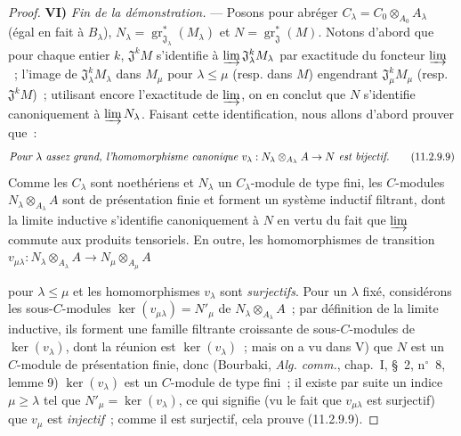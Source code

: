 \begin{proof}
\medskip
\noindent\textbf{VI)} \emph{Fin de la démonstration.} --- Posons pour abréger
$C_\lambda=C_0\otimes_{A_0}A_\lambda$ (égal en fait à $B_\lambda$),
$N_\lambda=\operatorname{gr}_{\mathfrak J_\lambda}^*(M_\lambda)$ et
$N=\operatorname{gr}_{\mathfrak J}^*(M)$. Notons d'abord que pour chaque
entier $k$, $\mathfrak J^kM$ s'identifie à
$\varinjlim\mathfrak J_\lambda^kM_\lambda$ par exactitude du foncteur
$\varinjlim$~; l'image de $\mathfrak J_\lambda^kM_\lambda$ dans $M_\mu$ pour
$\lambda\leq\mu$ (resp. dans $M$) engendrant $\mathfrak J_\mu^kM_\mu$
(resp. $\mathfrak J^kM$)~; utilisant encore l'exactitude de $\varinjlim$, on
en conclut que $N$ s'identifie canoniquement à $\varinjlim N_\lambda$. Faisant
cette identification, nous allons d'abord prouver que~:
\begin{equation}
\text{\emph{Pour $\lambda$ assez grand, l'homomorphisme canonique
$v_\lambda:N_\lambda\otimes_{A_\lambda}A\to N$ est bijectif.}}
\label{IV.11.2.9.9-fr}
\tag{11.2.9.9}
\end{equation}
Comme les $C_\lambda$ sont noethériens et $N_\lambda$ un $C_\lambda$-module
de type fini, les $C$-modules $N_\lambda\otimes_{A_\lambda}A$ sont de
présentation finie et forment un système inductif filtrant, dont la limite
inductive s'identifie canoniquement à $N$ en vertu du fait que $\varinjlim$
commute aux produits tensoriels. En outre, les homomorphismes de transition
$v_{\mu\lambda}:N_\lambda\otimes_{A_\lambda}A
\to N_\mu\otimes_{A_\mu}A$


pour $\lambda\leq\mu$ et les homomorphismes $v_\lambda$ sont \emph{surjectifs}.
Pour un $\lambda$ fixé, considérons les sous-$C$-modules
$\ker(v_{\mu\lambda})=N'_\mu$ de $N_\lambda\otimes_{A_\lambda}A$~; par
définition de la limite inductive, ils forment une famille filtrante croissante
de sous-$C$-modules de $\ker(v_\lambda)$, dont la réunion est
$\ker(v_\lambda)$~; mais on a vu dans V) que $N$ est un $C$-module de
présentation finie, donc (Bourbaki, \emph{Alg. comm.}, chap.~I, \S~2,
n$^\circ$~8, lemme 9) $\ker(v_\lambda)$ est un $C$-module de type fini~; il
existe par suite un indice $\mu\geq\lambda$ tel que
$N'_\mu=\ker(v_\lambda)$, ce qui signifie (vu le fait que $v_{\mu\lambda}$ est
surjectif) que $v_\mu$ est \emph{injectif}~; comme il est surjectif, cela
prouve (11.2.9.9).


\end{proof}
